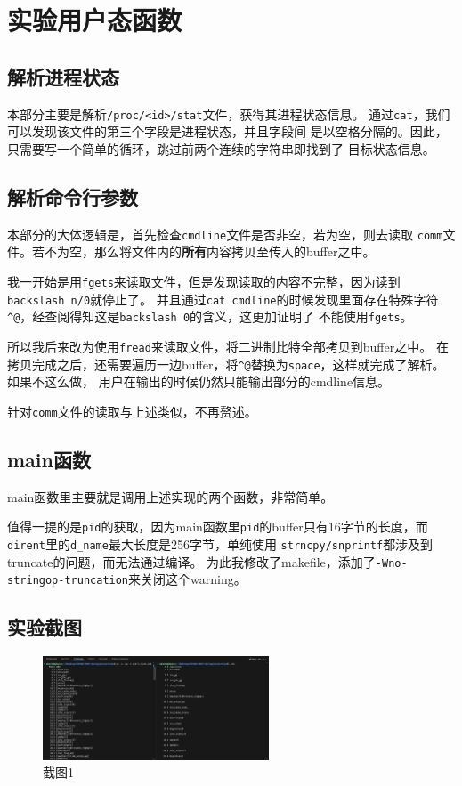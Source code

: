 \section{实验用户态函数}

\subsection{解析进程状态}
本部分主要是解析\texttt{/proc/<id>/stat}文件，获得其进程状态信息。
通过\texttt{cat}，我们可以发现该文件的第三个字段是进程状态，并且字段间
是以空格分隔的。因此，只需要写一个简单的循环，跳过前两个连续的字符串即找到了
目标状态信息。

\subsection{解析命令行参数}
本部分的大体逻辑是，首先检查\texttt{cmdline}文件是否非空，若为空，则去读取
\texttt{comm}文件。若不为空，那么将文件内的\textbf{所有}内容拷贝至传入的buffer之中。

我一开始是用\texttt{fgets}来读取文件，但是发现读取的内容不完整，因为读到\texttt{backslash n/0}就停止了。
并且通过\texttt{cat cmdline}的时候发现里面存在特殊字符\texttt{\textasciicircum @}，经查阅得知这是\texttt{backslash 0}的含义，这更加证明了
不能使用\texttt{fgets}。

所以我后来改为使用\texttt{fread}来读取文件，将二进制比特全部拷贝到buffer之中。
在拷贝完成之后，还需要遍历一边buffer，将\texttt{\textasciicircum @}替换为\texttt{space}，这样就完成了解析。如果不这么做，
用户在输出的时候仍然只能输出部分的cmdline信息。

针对\texttt{comm}文件的读取与上述类似，不再赘述。

\subsection{main函数}
main函数里主要就是调用上述实现的两个函数，非常简单。

值得一提的是\texttt{pid}的获取，因为main函数里\texttt{pid}的buffer只有16字节的长度，而
\texttt{dirent}里的\texttt{d\_name}最大长度是256字节，单纯使用
\texttt{strncpy/snprintf}都涉及到truncate的问题，而无法通过编译。
为此我修改了makefile，添加了\texttt{-Wno-stringop-truncation}来关闭这个warning。

\subsection{实验截图}

\begin{figure}[!h]
	\centering
	\includegraphics[width=0.6\textwidth]{../fig/p1.png}
	\caption{截图1}
\end{figure}

